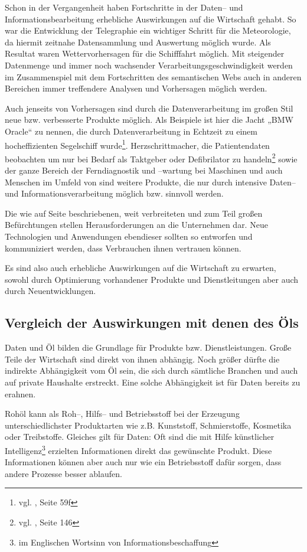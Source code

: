 Schon in der Vergangenheit haben Fortschritte in der Daten-- und Informationsbearbeitung erhebliche Auswirkungen auf die Wirtschaft gehabt. So war die Entwicklung der Telegraphie ein wichtiger Schritt für die Meteorologie, da hiermit zeitnahe Datensammlung und Auswertung möglich wurde. Als Resultat waren Wettervorhersagen für die Schiff{}fahrt möglich. Mit steigender Datenmenge und immer noch wachsender Verarbeitungsgeschwindigkeit werden im Zusammenspiel mit dem Fortschritten des semantischen Webs auch in anderen Bereichen immer treffendere Analysen und Vorhersagen möglich werden. 

Auch jenseits von Vorhersagen sind durch die Datenverarbeitung im großen Stil neue bzw. verbesserte Produkte möglich. Als Beispiele ist hier die Jacht „BMW Oracle“ zu nennen, die durch Datenverarbeitung in Echtzeit zu einem hocheffizienten Segelschiff wurde\footnote{vgl. \cite{laudon}, Seite 59f}. Herzschrittmacher, die Patientendaten beobachten um nur bei Bedarf als Taktgeber oder Defibrilator zu handeln\footnote{vgl. \cite{froeling}, Seite 146} sowie der ganze Bereich der Ferndiagnostik und --wartung bei Maschinen und auch Menschen im Umfeld von  sind weitere Produkte, die nur durch intensive Daten-- und Informationsverarbeitung möglich bzw. sinnvoll werden.

Die wie auf Seite \pageref{probleme} beschriebenen, weit verbreiteten und zum Teil großen Befürchtungen stellen Herausforderungen an die Unternehmen dar. Neue Technologien und Anwendungen ebendieser sollten so entworfen und kommuniziert werden, dass Verbrauchen ihnen vertrauen können.

Es sind also auch erhebliche Auswirkungen auf die Wirtschaft zu erwarten, sowohl durch Optimierung vorhandener Produkte und Dienstleitungen aber auch durch Neuentwicklungen.

\subsection{Vergleich der Auswirkungen mit denen des Öls}
\label{vergleich}

Daten und Öl bilden die Grundlage für Produkte bzw. Dienstleistungen. Große Teile der Wirtschaft sind direkt von ihnen abhängig. Noch größer dürfte die indirekte Abhängigkeit vom Öl sein, die sich durch sämtliche Branchen und auch auf private Haushalte erstreckt. Eine solche Abhängigkeit ist für Daten bereits zu erahnen.

Rohöl kann als Roh--, Hilfs-- und Betriebsstoff bei der Erzeugung unterschiedlichster Produktarten wie z.B. Kunststoff, Schmierstoffe, Kosmetika oder Treibstoffe. Gleiches gilt für Daten: Oft sind die mit Hilfe künstlicher Intelligenz\footnote{im Englischen Wortsinn von Informationsbeschaffung} erzielten Informationen direkt das gewünschte Produkt. Diese Informationen können aber auch nur wie ein Betriebsstoff dafür sorgen, dass andere Prozesse besser ablaufen.

